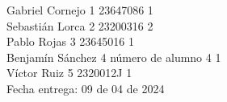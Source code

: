 \documentclass[letterpaper]{article}
\begin{document}
	\vspace*{30mm}
	\flushright 
	
	Gabriel Cornejo  1	23647086 1\\
	Sebastián Lorca  2	23200316 2\\
	Pablo Rojas  3	23645016 1\\
	Benjamín Sánchez  4	número de alumno 4 1\\
	Víctor Ruiz  5	2320012J 1\\
	
	
	\vspace*{5mm}
	{\large Fecha entrega: 09 de 04 de 2024\\}
	
	\newpage
	\begin{flushleft}
		\tableofcontents
	\end{flushleft}
	
\end{document}
